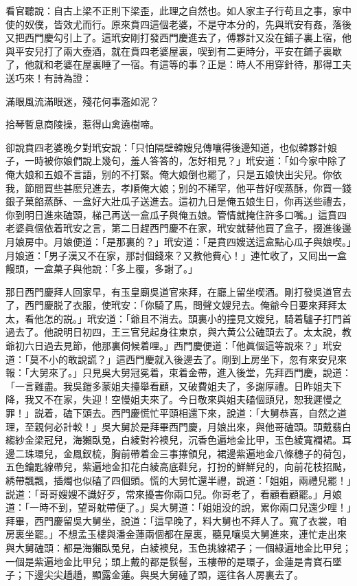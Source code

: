 看官聽說：自古上梁不正則下梁歪，此理之自然也。如人家主子行苟且之事，家中使的奴僕，皆效尤而行。原來賁四這個老婆，不是守本分的，先與玳安有姦，落後又把西門慶勾引上了。這玳安剛打發西門慶進去了，傅夥計又没在鋪子裏上宿，他與平安兒打了兩大壺酒，就在賁四老婆屋裏，喫到有二更時分，平安在鋪子裏歇了，他就和老婆在屋裏睡了一宿。有這等的事？正是：時人不用穿針待，那得工夫送巧來！有詩為證：

\begin{myquote}
滿眼風流滿眼迷，殘花何事濫如泥？

拾琴暫息商陵操，惹得山禽遶樹啼。
\end{myquote}

卻說賁四老婆晚夕對玳安說：「只怕隔壁韓嫂兒傳嚷得後邊知道，也似韓夥計娘子，一時被你娘們說上幾句，羞人答答的，怎好相見？」玳安道：「如今家中除了俺大娘和五娘不言語，别的不打緊。俺大娘倒也罷了，只是五娘快出尖兒。你依我，節間買些甚麽兒進去，孝順俺大娘；别的不稀罕，他平昔好喫蒸酥，你買一錢銀子菓餡蒸酥、一盒好大壯瓜子送進去。這初九日是俺五娘生日，你再送些禮去，你到明日進來磕頭，梯己再送一盒瓜子與俺五娘。管情就掩住許多口嘴。」這賁四老婆眞個依着玳安之言，第二日趕西門慶不在家，玳安就替他買了盒子，掇進後邊月娘房中。月娘便道：「是那裏的？」玳安道：「是賁四嫂送這盒點心瓜子與娘喫。」月娘道：「男子漢又不在家，那討個錢來？又教他費心！」連忙收了，又囘出一盒饅頭，一盒菓子與他說：「多上覆，多謝了。」

那日西門慶拜人回家早，有玉皇廟吳道官來拜，在廳上留坐喫酒。剛打發吳道官去了，西門慶脱了衣服，使玳安：「你騎了馬，問聲文嫂兒去。俺爺今日要來拜拜太太，看他怎的説。」玳安道：「爺且不消去。頭裏小的撞見文嫂兒，騎着驢子打門首過去了。他說明日初四，王三官兒起身往東京，與六黄公公磕頭去了。太太說，教爺初六日過去見節，他那裏伺候着哩。」西門慶便道：「他眞個這等說來？」玳安道：「莫不小的敢說謊？」這西門慶就入後邊去了。剛到上房坐下，忽有來安兒來報：「大舅來了。」只見吳大舅冠冕着，束着金帶，進入後堂，先拜西門慶，說道：「一言難盡。我吳鎧多蒙姐夫擡舉看顧，又破費姐夫了，多謝厚禮。日昨姐夫下降，我又不在家，失迎！空慢姐夫來了。今日敬來與姐夫磕個頭兒，恕我遲慢之罪！」説着，磕下頭去。西門慶慌忙平頭相還下來，說道：「大舅恭喜，自然之道理，至親何必計較！」吳大舅於是拜畢西門慶，月娘出來，與他哥磕頭。頭戴翡白縐紗金梁冠兒，海獺臥兔，白綾對衿襖兒，沉香色遍地金比甲，玉色綾寬襴裙。耳邊二珠環兒，金鳳釵梳，胸前帶着金三事㩟領兒，裙邊紫遍地金八條穗子的荷包，五色鑰匙線帶兒，紫遍地金扣花白綾高底鞋兒，打扮的鮮鮮兒的，向前花枝招颭，綉帶飄飄，插燭也似磕了四個頭。慌的大舅忙還半禮，說道：「姐姐，兩禮兒罷！」説道：「哥哥嫂嫂不識好歹，常來擾害你兩口兒。你哥老了，看顧看顧罷。」月娘道：「一時不到，望哥躭帶便了。」吳大舅道：「姐姐没的說，累你兩口兒還少哩！」拜畢，西門慶留吳大舅坐，說道：「這早晚了，料大舅也不拜人了。寬了衣裳，咱房裏坐罷。」不想孟玉樓與潘金蓮兩個都在屋裏，聽見嚷吳大舅進來，連忙走出來與大舅磕頭：都是海獺臥兔兒，白綾襖兒，玉色挑線裙子；一個綠遍地金比甲兒；一個是紫遍地金比甲兒；頭上戴的都是䯼髻，玉樓帶的是環子，金蓮是青寶石墜子；下邊尖尖趫趫，顯露金蓮。與吳大舅磕了頭，逕往各人房裏去了。

